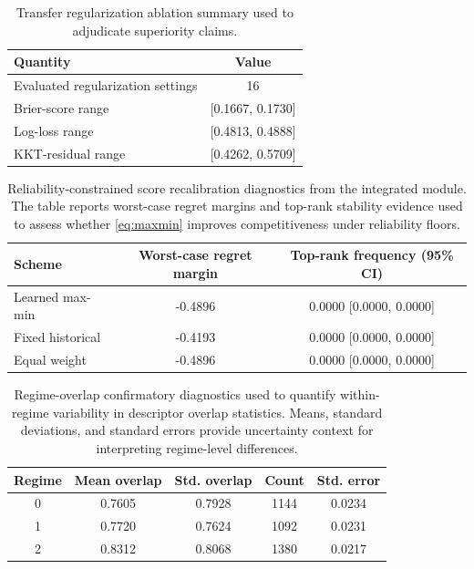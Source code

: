 \documentclass{article} %
\begin{document}
\begin{table}[t]
\caption{Transfer regularization ablation summary used to adjudicate superiority claims.}
\label{tab:transfer-ablation}
\centering
\small
\renewcommand{\arraystretch}{1.1}
\setlength{\tabcolsep}{4pt}
\begin{tabular}{lc}
\hline
Quantity & Value \\
\hline
Evaluated regularization settings & 16 \\
Brier-score range & [0.1667, 0.1730] \\
Log-loss range & [0.4813, 0.4888] \\
KKT-residual range & [0.4262, 0.5709] \\
\hline
\end{tabular}
\end{table}

\begin{table}[t]
\caption{Reliability-constrained score recalibration diagnostics from the integrated module. The table reports worst-case regret margins and top-rank stability evidence used to assess whether \eqref{eq:maxmin} improves competitiveness under reliability floors.}
\label{tab:h5appendix}
\centering
\small
\renewcommand{\arraystretch}{1.1}
\setlength{\tabcolsep}{4pt}
\begin{tabular}{lcc}
\hline
Scheme & Worst-case regret margin & Top-rank frequency (95\% CI) \\
\hline
Learned max-min & -0.4896 & 0.0000 [0.0000, 0.0000] \\
Fixed historical & -0.4193 & 0.0000 [0.0000, 0.0000] \\
Equal weight & -0.4896 & 0.0000 [0.0000, 0.0000] \\
\hline
\end{tabular}
\end{table}

\begin{table}[t]
\caption{Regime-overlap confirmatory diagnostics used to quantify within-regime variability in descriptor overlap statistics. Means, standard deviations, and standard errors provide uncertainty context for interpreting regime-level differences.}
\label{tab:regime-overlap}
\centering
\small
\renewcommand{\arraystretch}{1.1}
\setlength{\tabcolsep}{4pt}
\begin{tabular}{ccccc}
\hline
Regime & Mean overlap & Std. overlap & Count & Std. error \\
\hline
0 & 0.7605 & 0.7928 & 1144 & 0.0234 \\
1 & 0.7720 & 0.7624 & 1092 & 0.0231 \\
2 & 0.8312 & 0.8068 & 1380 & 0.0217 \\
\hline
\end{tabular}
\end{table}
\end{document}
